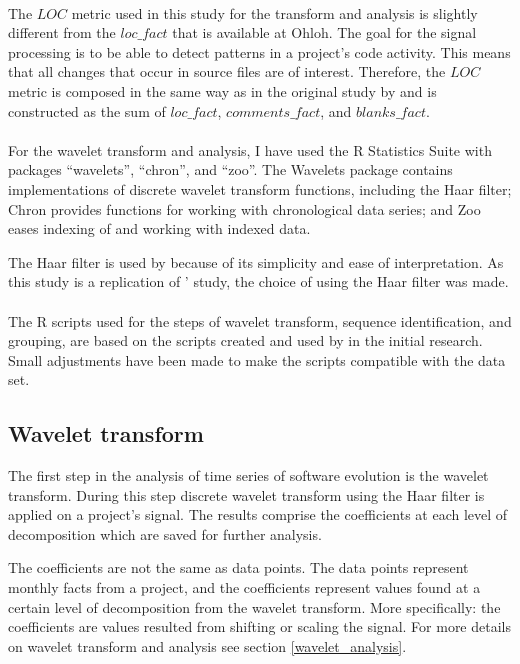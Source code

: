 \paragraph{}
The $LOC$ metric used in this study for the transform and analysis is slightly
different from the $loc\_fact$ that is available at Ohloh. The goal for the
signal processing is to be able to detect patterns in a project's code
activity. This means that all changes that occur in source files are of
interest. Therefore, the $LOC$ metric is composed in the same way as in the
original study by \citet{karus2013} and is constructed as the sum of
$loc\_fact$, $comments\_fact$, and $blanks\_fact$.

\paragraph{}
For the wavelet transform and analysis, I have used the R Statistics Suite
with packages ``wavelets'', ``chron'', and ``zoo''. The Wavelets package
contains implementations of discrete wavelet transform functions, including
the Haar filter; Chron provides functions for working with chronological data
series; and Zoo eases indexing of and working with indexed data.

The Haar filter is used by \citet{karus2013} because of its simplicity and ease
of interpretation. As this study is a replication of \citeauthor{karus2013}'
study, the choice of using the Haar filter was made.

\paragraph{}
The R scripts used for the steps of wavelet transform, sequence identification,
and grouping, are based on the scripts created and used by
\citeauthor{karus2013} in the initial research. Small adjustments have been
made to make the scripts compatible with the data set.

\subsection{Wavelet transform}
The first step in the analysis of time series of software evolution is the
wavelet transform. During this step discrete wavelet transform using the Haar
filter is applied on a project's signal. The results comprise the
coefficients at each level of decomposition which are saved for further
analysis.

The coefficients are not the same as data points. The data points represent
monthly facts from a project, and the coefficients represent values found at a
certain level of decomposition from the wavelet transform. More specifically:
the coefficients are values resulted from shifting or scaling the signal. For
more details on wavelet transform and analysis see section
\ref{wavelet_analysis}.

